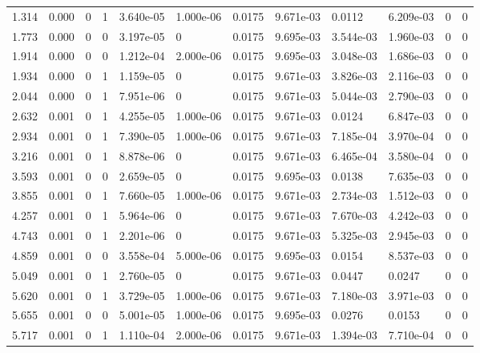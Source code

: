 \documentclass[preview]{standalone}
\begin{document}
{{\begin{tabular}{L{1.2cm}C{1.2cm} C{0.3cm}C{0.5cm} C{1.4cm}C{1.4cm} C{1.4cm}C{1.4cm} C{1.6cm}C{1.6cm} C{1.6cm}C{1.6cm}}
  1.314  &  0.000  & 0     &  1 &  3.640e-05  & 1.000e-06  &  0.0175&   9.671e-03& 0.0112 & 6.209e-03   &  0 & 0  \\ 
  1.773  &  0.000  & 0     &  0 &  3.197e-05  & 0  &  0.0175&   9.695e-03& 3.544e-03 & 1.960e-03   &  0 & 0  \\ 
  1.914  &  0.000  & 0     &  0 &  1.212e-04  & 2.000e-06  &  0.0175&   9.695e-03& 3.048e-03 & 1.686e-03   &  0 & 0  \\ 
  1.934  &  0.000  & 0     &  1 &  1.159e-05  & 0  &  0.0175&   9.671e-03& 3.826e-03 & 2.116e-03   &  0 & 0  \\ 
  2.044  &  0.000  & 0     &  1 &  7.951e-06  & 0  &  0.0175&   9.671e-03& 5.044e-03 & 2.790e-03   &  0 & 0  \\ 
  2.632  &  0.001  & 0     &  1 &  4.255e-05  & 1.000e-06  &  0.0175&   9.671e-03& 0.0124 & 6.847e-03   &  0 & 0  \\ 
  2.934  &  0.001  & 0     &  1 &  7.390e-05  & 1.000e-06  &  0.0175&   9.671e-03& 7.185e-04 & 3.970e-04   &  0 & 0  \\ 
  3.216  &  0.001  & 0     &  1 &  8.878e-06  & 0  &  0.0175&   9.671e-03& 6.465e-04 & 3.580e-04   &  0 & 0  \\ 
  3.593  &  0.001  & 0     &  0 &  2.659e-05  & 0  &  0.0175&   9.695e-03& 0.0138 & 7.635e-03   &  0 & 0  \\ 
  3.855  &  0.001  & 0     &  1 &  7.660e-05  & 1.000e-06  &  0.0175&   9.671e-03& 2.734e-03 & 1.512e-03   &  0 & 0  \\ 
  4.257  &  0.001  & 0     &  1 &  5.964e-06  & 0  &  0.0175&   9.671e-03& 7.670e-03 & 4.242e-03   &  0 & 0  \\ 
  4.743  &  0.001  & 0     &  1 &  2.201e-06  & 0  &  0.0175&   9.671e-03& 5.325e-03 & 2.945e-03   &  0 & 0  \\ 
  4.859  &  0.001  & 0     &  0 &  3.558e-04  & 5.000e-06  &  0.0175&   9.695e-03& 0.0154 & 8.537e-03   &  0 & 0  \\ 
  5.049  &  0.001  & 0     &  1 &  2.760e-05  & 0  &  0.0175&   9.671e-03& 0.0447 & 0.0247   &  0 & 0  \\ 
  5.620  &  0.001  & 0     &  1 &  3.729e-05  & 1.000e-06  &  0.0175&   9.671e-03& 7.180e-03 & 3.971e-03   &  0 & 0  \\ 
  5.655  &  0.001  & 0     &  0 &  5.001e-05  & 1.000e-06  &  0.0175&   9.695e-03& 0.0276 & 0.0153   &  0 & 0  \\ 
  5.717  &  0.001  & 0     &  1 &  1.110e-04  & 2.000e-06  &  0.0175&   9.671e-03& 1.394e-03 & 7.710e-04   &  0 & 0  \\ 

\end{tabular}}}
\end{document}
